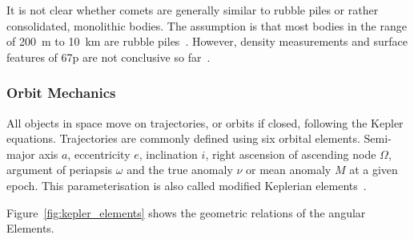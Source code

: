 It is not clear whether comets are generally similar to rubble piles or rather consolidated, monolithic bodies. The assumption is that most bodies in the range of \SI{200}{\meter} to \SI{10}{\kilo\meter} are rubble piles~\cite{Walsh2018RubbleAsteroids}. However, density measurements and surface features of \gls{67p} are not conclusive so far~\cite{Weissman2020OriginNuclei}. 

\subsubsection{Orbit Mechanics}
All objects in space move on trajectories, or orbits if closed, following the Kepler equations. Trajectories are commonly defined using six orbital elements.
Semi-major axis $a$, eccentricity $e$, inclination $i$, right ascension of ascending node $\Omega$, argument of periapsis $\omega$ and the true anomaly $\nu$ or mean anomaly $M$ at a given epoch. This parameterisation is also called modified Keplerian elements~\cite{Hintz2015FundamentalsAstrodynamics}.

Figure~\ref{fig:kepler_elements} shows the geometric relations of the angular Elements.

